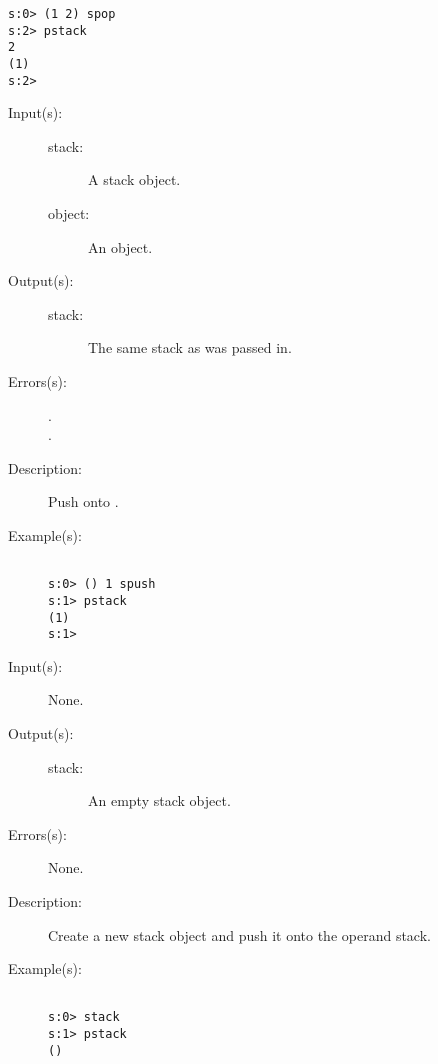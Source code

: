 \begin{description}
\begin{description}
\begin{verbatim}
s:0> (1 2) spop
s:2> pstack
2
(1)
s:2>
		\end{verbatim}
	\end{description}
\label{systemdict:spush}
\item[{\stilop{stack object}{spush}{stack}}: ]
	\begin{description}\item[]
	\item[Input(s): ]
		\begin{description}\item[]
		\item[stack: ]
			A stack object.
		\item[object: ]
			An object.
		\end{description}
	\item[Output(s): ]
		\begin{description}\item[]
		\item[stack: ]
			The same stack as was passed in.
		\end{description}
	\item[Errors(s): ]
		\begin{description}\item[]
		\item[.]
		\item[.]
		\end{description}
	\item[Description: ]
		Push  onto .
	\item[Example(s): ]\begin{verbatim}

s:0> () 1 spush
s:1> pstack
(1)
s:1>
		\end{verbatim}
	\end{description}
\label{systemdict:stack}
\item[{\stilop{--}{stack}{stack}}: ]
	\begin{description}\item[]
	\item[Input(s): ] None.
	\item[Output(s): ]
		\begin{description}\item[]
		\item[stack: ]
			An empty stack object.
		\end{description}
	\item[Errors(s): ] None.
	\item[Description: ]
		Create a new stack object and push it onto the operand stack.
	\item[Example(s): ]\begin{verbatim}

s:0> stack
s:1> pstack
()
		\end{verbatim}
	\end{description}
\end{description}

